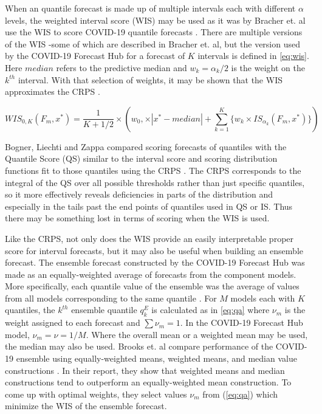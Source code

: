 \documentclass[11pt,notitlepage]{isuthesis}
\begin{document}
When an quantile forecast is made up of multiple intervals each with different
$\alpha$ levels, the weighted interval score (WIS) may be used as it was by
Bracher et.
al use the WIS to score COVID-19 quantile forecasts 
\cite[]{bracher2021evaluating}.
There are multiple versions of the WIS -some of 
which are described in Bracher et. al, but the version used by the COVID-19 
Forecast
Hub for a forecast of $K$ intervals is defined in \eqref{eq:wis}.
Here $median$ refers to the predictive median and $w_k = \alpha_k/2$ is the 
weight on the $k^{th}$
interval. With that selection of weights, it may be shown that the
WIS approximates the CRPS \cite[see S1 Text therein]{bracher2021evaluating}.

\begin{equation}
\label{eq:wis}
  WIS_{0,K}(F_m,x^*) = \frac{1}{K + 1/2} \times (w_0, \times |x^*-median|+
  \sum_{k=1}^K \{ w_k \times IS_{\alpha_k}(F_m,x^*) \} )
\end{equation}


Bogner, Liechti and Zappa compared scoring forecasts of quantiles with the 
Quantile Score (QS) similar to the interval score and scoring distribution functions
fit to those quantiles using the CRPS \cite[]{bogner2017combining}. The CRPS 
corresponds to the integral of the QS over all possible thresholds rather than
just specific quantiles, so it more effectively reveals deficiencies in parts of 
the distribution and especially in the tails past the end points of quantiles
used in QS or IS. Thus there may be something lost in terms of scoring when the 
WIS is used.

Like the CRPS, not only does the WIS provide an easily interpretable proper 
score for interval forecasts, but it may also be useful when building an 
ensemble forecast.
The ensemble forecast constructed by the COVID-19 Forecast Hub was made as an
equally-weighted average of forecasts from the component models. More 
specifically, each quantile value of the ensemble was the average of values from
all models corresponding to the same quantile \cite[]{ray2020ensemble}. For $M$ 
models each with $K$ quantiles, the $k^{th}$ ensemble quantile $q^E_k$ is 
calculated as in \eqref{eq:qa}
where $\nu_m$ is the weight assigned to each forecast and $\sum \nu_m = 1$. In
the COVID-19 Forecast Hub model, $\nu_m = \nu = 1/M$. Where the overall mean or 
a weighted mean may be used, the median may also be used.
Brooks et. al compare performance of the COVID-19 ensemble
using equally-weighted means, weighted means, and median value constructions
\cite[]{brooks2020comparing}.
In their report, they show that weighted means and median constructions tend
to outperform an equally-weighted mean construction. To come up with optimal 
weights, they select values $\nu_m$ from (\ref{eq:qa}) which minimize the WIS of 
the ensemble forecast.
\end{document}
